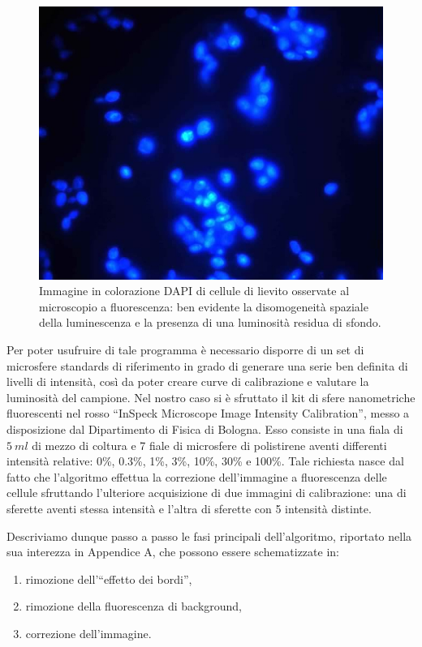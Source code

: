 \begin{figure}
 \centering
 \includegraphics[scale=.55]{img/CAP3bordi.jpg}
 \caption{\small{Immagine in colorazione DAPI di cellule di lievito osservate al microscopio a fluorescenza: ben evidente la disomogeneità spaziale della luminescenza e la presenza di una luminosità residua di sfondo.}}
 \label{fig:bordi}
\end{figure}

Per poter usufruire di tale programma è necessario disporre di un set di microsfere standards di riferimento in grado di generare una serie ben definita di livelli di intensità, così da poter creare curve di calibrazione e valutare la luminosità del campione. 
Nel nostro caso si è sfruttato il kit di sfere nanometriche fluorescenti nel rosso ``InSpeck Microscope Image Intensity Calibration'', messo a disposizione dal Dipartimento di Fisica di Bologna. 
Esso consiste in una fiala di $5\ ml$ di mezzo di coltura e 7 fiale di microsfere di polistirene aventi differenti intensità relative: 0\%, 0.3\%, 1\%, 3\%, 10\%, 30\% e 100\%.
Tale richiesta nasce dal fatto che l'algoritmo effettua la correzione dell'immagine a fluorescenza delle cellule sfruttando l'ulteriore acquisizione di due immagini di calibrazione: una di sferette aventi stessa intensità e l'altra di sferette con 5 intensità distinte.

Descriviamo dunque passo a passo le fasi principali dell'algoritmo, riportato nella sua interezza in Appendice A, che possono essere schematizzate in:
\begin{enumerate}
 \item rimozione dell'``effetto dei bordi'',
 \item rimozione della fluorescenza di background,
 \item correzione dell'immagine.
\end{enumerate}



